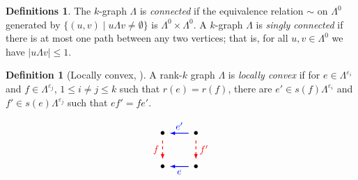 \documentclass[12pt]{amsart}
\theoremstyle{definition}
\newtheorem{dfn}[thm]{Definition}
\newtheorem{dfns}[thm]{Definitions}
\theoremstyle{remark}
\newtheorem{example}[thm]{Example}
\numberwithin{equation}{section}
\newcommand{\NN}{\mathbb{N}}
\newcommand{\Cc}{\mathcal{C}}
\begin{document}
%
%

\begin{dfns}
The $k$-graph  $\Lambda$ is \emph{connected} if the equivalence relation $\sim$ on $\Lambda^0$ generated by $\{(u,v)\mid u\Lambda v\ne\emptyset\}$ is $\Lambda^0\times\Lambda^0$.
A $k$-graph $\Lambda$ is \emph{singly connected} if there is at most one path between any two  vertices; that is, for all $u,v \in \Lambda^0$ we have $| u {\Lambda}v | \le 1$.
\end{dfns}
\begin{minipage}[l]{0.8\textwidth}
\begin{dfn}[{Locally convex, \cite[Definition 3.9]{RSY1}}]
A rank-$k$ graph $\Lambda$ is \textit{locally convex} if for $e \in \Lambda^{\varepsilon_i}$
and $f \in \Lambda^{\varepsilon_j}$, $1 \le i \neq j \le k$ such that $r(e) = r(f)$, there are $e' \in s ( f ) \Lambda^{\varepsilon_i}$ and $f' \in s(e)\Lambda^{\varepsilon_j}$ such that $ef'=fe'$.
\end{dfn}
\end{minipage}%
\begin{minipage}[r]{0.2\textwidth}
\[
\begin{tikzpicture}[scale=0.6]

 \node[inner sep=2.8pt, circle] (27) at (0,0) {$\bullet$};
\node[inner sep=2.8pt, circle] (28) at (0,2) {$\bullet$};	
\node[inner sep=2.8pt, circle] (29) at (2,0) {$\bullet$};
\node[inner sep=2.8pt, circle] (30) at (2,2) {$\bullet$};	
\path[->, red, dashed, >=latex,thick] (28) edge [left] node {$f$} (27);
\path[->, red, dashed, >=latex,thick] (30) edge [right] node {$f'$} (29);

\path[->, blue, >=latex,thick] (29) edge [below] node {$e$} (27);
\path[->, blue, >=latex,thick] (30) edge [above] node {$e'$} (28);

\end{tikzpicture}
\]
\end{minipage}
\end{document}
